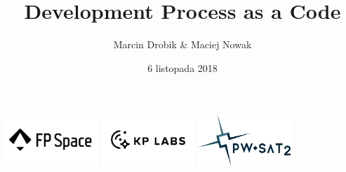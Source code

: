 \documentclass[ignorenonframetext]{beamer}
\title{Development Process as a Code}
\author{Marcin Drobik \& Maciej Nowak}
\date{6 listopada 2018}
\begin{document}
\begin{frame}
	\titlepage
	\centering
	\includegraphics[width=3.5cm]{images/fp-space.png}
	\includegraphics[width=3.5cm]{images/kp-labs.png}
	\includegraphics[width=3.5cm]{images/pw-sat.png}
\end{frame}
\end{document}
